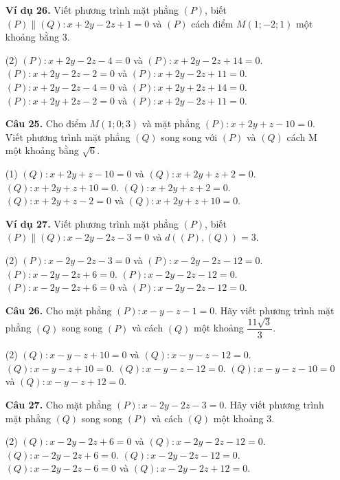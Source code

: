\documentclass[12pt, a4paper]{article}
\begin{document}
\begin{enumerate}[label=\textbf{\arabic*.}, wide=0pt, leftmargin=*]
    \item[\textbf{Ví dụ 26.}] Viết phương trình mặt phẳng \((P)\), biết \((P) \parallel (Q): x+2y-2z+1=0\) và \((P)\) cách điểm \(M(1;-2;1)\) một khoảng bằng 3.
    \begin{tasks}(2)
        \task \((P): x+2y-2z-4=0\) và \((P): x+2y-2z+14=0\).
        \task \((P): x+2y-2z-2=0\) và \((P): x+2y-2z+11=0\).
        \task \((P): x+2y-2z-4=0\) và \((P): x+2y+2z+14=0\).
        \task \((P): x+2y+2z-2=0\) và \((P): x+2y-2z+11=0\).
    \end{tasks}
    
    
    \item[\textbf{Câu 25.}] Cho điểm \(M(1;0;3)\) và mặt phẳng \((P) : x+2y+z-10=0\). Viết phương trình mặt phẳng \((Q)\) song song với \((P)\) và \((Q)\) cách M một khoảng bằng \(\sqrt{6}\).
    \begin{tasks}[label-width=1.5em](1)
        \task \((Q): x+2y+z-10=0\) và \((Q): x+2y+z+2=0\).
        \task \((Q): x+2y+z+10=0\).
        \task \((Q): x+2y+z+2=0\).
        \task \((Q): x+2y+z-2=0\) và \((Q): x+2y+z+10=0\).
    \end{tasks}
    
    \item[\textbf{Ví dụ 27.}] Viết phương trình mặt phẳng \((P)\), biết \((P)\parallel(Q) : x-2y-2z-3=0\) và \(d((P),(Q))=3\).
    \begin{tasks}(2)
        \task \((P): x-2y-2z-3=0\) và \((P): x-2y-2z-12=0\).
        \task \((P): x-2y-2z+6=0\).
        \task \((P): x-2y-2z-12=0\).
        \task \((P): x-2y-2z+6=0\) và \((P): x-2y-2z-12=0\).
    \end{tasks}
    
    \item[\textbf{Câu 26.}] Cho mặt phẳng \((P) : x-y-z-1=0\). Hãy viết phương trình mặt phẳng \((Q)\) song song \((P)\) và cách \((Q)\) một khoảng \(\dfrac{11\sqrt{3}}{3}\).
    \begin{tasks}(2)
        \task \((Q): x-y-z+10=0\) và \((Q): x-y-z-12=0\).
        \task \((Q): x-y-z+10=0\).
        \task \((Q): x-y-z-12=0\).
        \task \((Q): x-y-z-10=0\) và \((Q): x-y-z+12=0\).
    \end{tasks}

    \item[\textbf{Câu 27.}] Cho mặt phẳng \((P): x-2y-2z-3=0\). Hãy viết phương trình mặt phẳng \((Q)\) song song \((P)\) và cách \((Q)\) một khoảng 3.
    \begin{tasks}(2)
        \task \((Q): x-2y-2z+6=0\) và \((Q): x-2y-2z-12=0\).
        \task \((Q): x-2y-2z+6=0\).
        \task \((Q): x-2y-2z-12=0\).
        \task \((Q): x-2y-2z-6=0\) và \((Q): x-2y-2z+12=0\).
    \end{tasks}
    

\end{enumerate}
\end{document}
